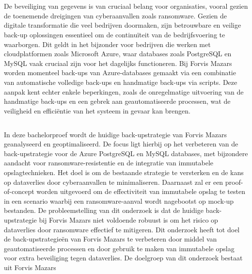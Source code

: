 
\chapter{}%
\label{ch:inleiding}

De beveiliging van gegevens is van cruciaal belang voor organisaties, vooral gezien de toenemende dreigingen van cyberaanvallen zoals ransomware. Gezien de digitale transformatie die veel bedrijven doormaken, zijn betrouwbare en veilige back-up oplossingen essentieel om de continuïteit van de bedrijfsvoering te waarborgen. Dit geldt in het bijzonder voor bedrijven die werken met cloudplatformen zoals Microsoft Azure, waar databases zoals PostgreSQL en MySQL vaak cruciaal zijn voor het dagelijks functioneren. Bij Forvis Mazars worden momenteel back-ups van Azure-databases gemaakt via een combinatie van automatische volledige back-ups en handmatige back-ups via scripts. Deze aanpak kent echter enkele beperkingen, zoals de onregelmatige uitvoering van de handmatige back-ups en een gebrek aan geautomatiseerde processen, wat de veiligheid en efficiëntie van het systeem in gevaar kan brengen.



\section{}%
\label{sec:probleemstelling}
In deze bachelorproef wordt de huidige back-upstrategie van Forvis Mazars geanalyseerd en geoptimaliseerd. De focus ligt hierbij op het verbeteren van de back-upstrategie voor de Azure PostgreSQL en MySQL databases, met bijzondere aandacht voor ransomware-resistentie en de integratie van immutabele opslagtechnieken. Het doel is om de bestaande strategie te versterken en de kans op dataverlies door cyberaanvallen te minimaliseren. Daarnaast zal er een proof-of-concept worden uitgevoerd om de effectiviteit van immutabele opslag te testen in een scenario waarbij een ransomware-aanval wordt nagebootst op mock-up bestanden. De probleemstelling van dit onderzoek is dat de huidige back-upstrategie bij Forvis Mazars niet voldoende robuust is om het risico op dataverlies door ransomware effectief te mitigeren. Dit onderzoek heeft tot doel de back-upstrategieën van Forvis Mazars te verbeteren door middel van geautomatiseerde processen en door gebruik te maken van immutabele opslag voor extra beveiliging tegen dataverlies. De doelgroep van dit onderzoek bestaat uit Forvis Mazars

